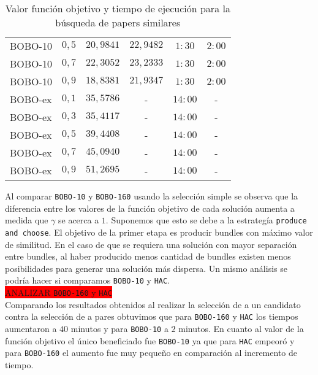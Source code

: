 \begin{table}[H]
{\begin{tabular}{|lc|cccc|}
    BOBO-10 & $0,5$ & $20,9841$  & $22,9482$ & $1:30$ & $2:00$ \\
    BOBO-10 & $0,7$ & $22,3052$  & $23,2333$ & $1:30$ & $2:00$ \\
    BOBO-10 & $0,9$ & $18,8381$  & $21,9347$ & $1:30$ & $2:00$ \\
    BOBO-ex & $0,1$ & $35,5786$  & - & $14:00$ & - \\
    BOBO-ex & $0,3$ & $35,4117$  & - & $14:00$ & - \\
    BOBO-ex & $0,5$ & $39,4408$  & - & $14:00$ & - \\
    BOBO-ex & $0,7$ & $45,0940$  & - & $14:00$ & - \\
    BOBO-ex & $0,9$ & $51,2695$  & - & $14:00$ & - \\
    \hline
    \end{tabular}
  }
  \caption {Valor función objetivo y tiempo de ejecución para la búsqueda de papers similares}
\end{table}
Al comparar \texttt{BOBO-10} y \texttt{BOBO-160} usando la selección simple se observa que la 
diferencia entre los valores de la función objetivo de cada solución aumenta a medida que $\gamma$ 
se acerca a $1$. Suponemos que esto se debe a la estrategía \texttt{produce and choose}. El 
objetivo 
de la primer etapa es producir bundles con máximo valor de similitud. En el caso de que se requiera 
una solución con mayor separación entre bundles, al haber producido menos cantidad de bundles 
existen menos posibilidades para generar una solución más dispersa. Un mismo análisis se podría 
hacer si comparamos \texttt{BOBO-10} y \texttt{HAC}.\\
\colorbox{red}{ANALIZAR \texttt{BOBO-160} y \texttt{HAC}}\\
Comparando los resultados obtenidos al realizar la selección de a un candidato contra la selección 
de a pares obtuvimos que para \texttt{BOBO-160} y \texttt{HAC} los tiempos aumentaron a $40$ 
minutos y para \texttt{BOBO-10} a $2$ minutos. En cuanto al valor de la función objetivo el único 
beneficiado fue \texttt{BOBO-10} ya que para \texttt{HAC} empeoró y para \texttt{BOBO-160} el 
aumento fue muy pequeño en comparación al incremento de tiempo.
